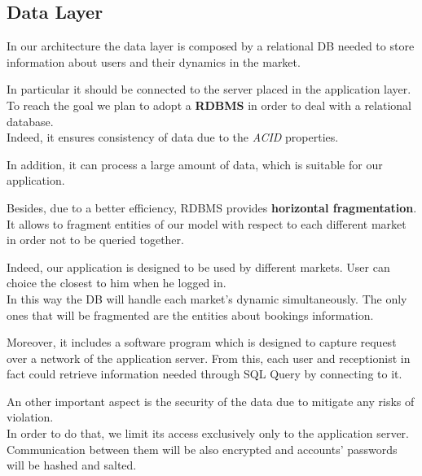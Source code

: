\pagebreak

\subsection{Data Layer}

In our architecture the data layer is composed by a relational DB needed to store information about users and their dynamics in the market. 

In particular it should be connected to the server placed in the application layer. To reach the goal we plan to adopt a \textbf{RDBMS} in order to deal with a relational database.\\
Indeed, it ensures consistency of data due to the \textit{ACID} properties.

In addition, it can process a large amount of data, which is suitable for our application. 

Besides, due to a better efficiency, RDBMS provides \textbf{horizontal fragmentation}. It allows to fragment entities of our model with respect to each different market in order not to be queried together. 

Indeed, our application is designed to be used by different markets. User can choice the closest to him when he logged in. \\
In this way the DB will handle each market's dynamic simultaneously.
The only ones that will be fragmented are the entities about bookings information.   

Moreover, it includes a software program which is designed to capture request over a network of the application server. From this, each user and receptionist in fact could retrieve information needed through SQL Query by connecting to it.  


An other important aspect is the security of the data due to mitigate any risks of violation.\\
In order to do that, we limit its access exclusively only to the application server. Communication between them will be also encrypted and accounts' passwords will be hashed and salted.



